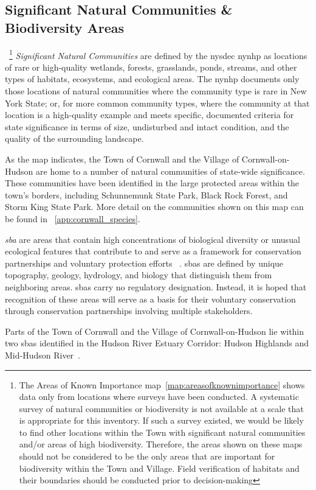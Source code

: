 \subsection*{Significant Natural Communities \& Biodiversity Areas}~\footnote{The 
Areas of Known Importance map~\ref{map:areasofknownimportance} shows data only 
from locations where surveys have been conducted. A systematic survey of natural 
communities or biodiversity is not available at a scale that is appropriate for 
this inventory. If such a survey existed, we would be likely to find other 
locations within the Town with significant natural communities and/or areas of 
high biodiversity.  Therefore, the areas shown on these maps should not be 
considered to be the only areas that are important for biodiversity within the 
Town and Village. Field verification of habitats and their boundaries should be 
conducted prior to decision-making} \textit{Significant Natural Communities} are 
defined by the \gls{nysdec} \gls{nynhp} as locations of rare or high-quality 
wetlands, forests, grasslands, ponds, streams, and other types of habitats, 
ecosystems, and ecological areas. The \gls{nynhp} documents only those locations 
of natural communities where the community type is rare in New York State; or, 
for more common community types, where the community at that location is a 
high-quality example and meets specific, documented criteria for state 
significance in terms of size, undisturbed and intact condition, and the quality 
of the surrounding landscape.
\par
As the map indicates, the Town of Cornwall and the Village of
Cornwall-on-Hudson are home to a number of natural communities of state-wide
significance. These communities have been identified in the large protected
areas within the town's borders, including Schunnemunk State Park, Black Rock
Forest, and Storm King State Park. More detail on the communities shown on this
map can be found in ~\ref{app:cornwall_species}. 
\par
\textit{\gls{sba}} are areas that contain high concentrations of biological diversity or
unusual ecological features that contribute to and serve as a framework for
conservation partnerships and voluntary protection efforts ~\citep{haeckel2014}.
\gls{sba}s are defined by unique topography, geology, hydrology, and biology
that distinguish them from neighboring areas. \gls{sba}s carry no regulatory
designation. Instead, it is hoped that recognition of these areas will serve as
a basis for their voluntary conservation through conservation partnerships
involving multiple stakeholders.
\par
Parts of the Town of Cornwall and the Village of Cornwall-on-Hudson lie within
two \gls{sba}s identified in the Hudson River Estuary Corridor: Hudson
Highlands and Mid-Hudson River~\citep{penhollow2006}.
